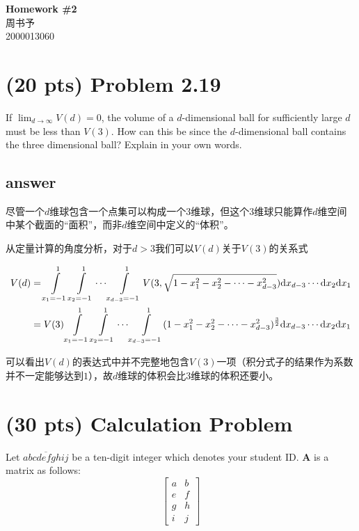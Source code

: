 \documentclass[12pt]{article}
\newcommand{\hwid}{2}			%
\newcommand{\name}{周书予} 		%
\newcommand{\id}{2000013060} 	%
\begin{document}
    \pagestyle{fancy}
    \chead{}

    \begin{center}
        {\LARGE \bf Homework \#\hwid}\\
        {\Large \name}\\
        {\Large \id}\\
    \end{center}


\section{(20 pts) Problem 2.19}
If $\lim _{d \rightarrow \infty} V(d)=0$, the volume of a $d$-dimensional ball for sufficiently large $d$ must be less than $V (3)$. How can this be since the $d$-dimensional ball contains the three dimensional ball? Explain in your own words.
\subsection*{answer}
尽管一个$d$维球包含一个点集可以构成一个$3$维球，但这个$3$维球只能算作$d$维空间中某个截面的“面积”，而非$d$维空间中定义的“体积”。

从定量计算的角度分析，对于$d > 3$我们可以$V(d)$关于$V(3)$的关系式

\begin{align*}
V(d) &= \int\limits_{x_1 = -1}^{1}\int\limits_{x_2 = -1}^{1} \cdots \int\limits_{x_{d-3}=-1}^{1}V(3, \sqrt{1 - x_1^2 - x_2^2 - \cdots - x_{d-3}^2})\text dx_{d-3}\cdots\text dx_2\text dx_1\\
&= V(3)\int\limits_{x_1 = -1}^{1}\int\limits_{x_2 = -1}^{1} \cdots \int\limits_{x_{d-3}=-1}^{1}(1 - x_1^2 - x_2^2 - \cdots - x_{d-3}^2)^{\frac32}\text dx_{d-3}\cdots\text dx_2\text dx_1
\end{align*}

可以看出$V(d)$的表达式中并不完整地包含$V(3)$一项（积分式子的结果作为系数并不一定能够达到$1$），故$d$维球的体积会比$3$维球的体积还要小。

\section{(30 pts) Calculation Problem}
Let $\overline{abcdefghij}$ be a ten-digit integer which denotes your student ID. $\mathbf{A}$ is a matrix as follows:
$$
    \begin{bmatrix}
    a & b \\
    e & f \\
    g & h \\
    i & j
    \end{bmatrix}
$$
\end{document}
